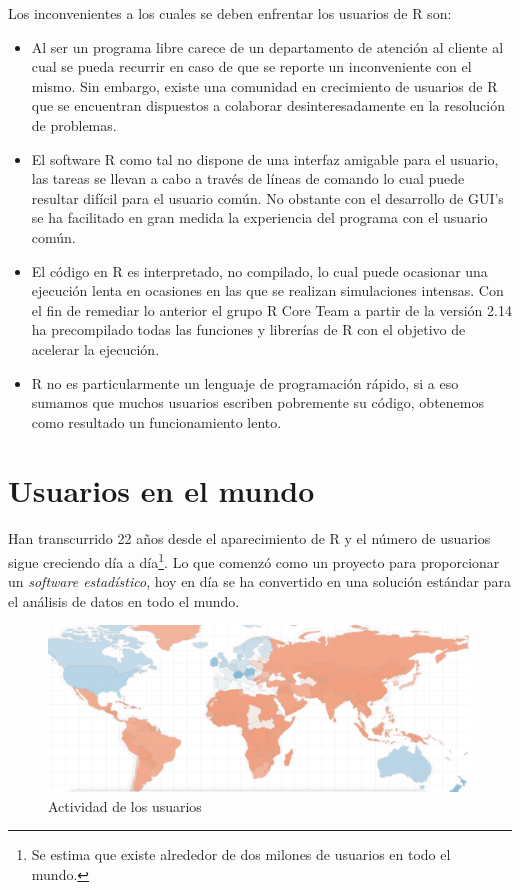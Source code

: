 \documentclass[11pt,a4paper,oneside]{book}\usepackage[]{graphicx}\usepackage[]{color}
\begin{document}
Los inconvenientes a los cuales se deben enfrentar los usuarios de R son:
\begin{itemize}
  \item Al ser un programa libre carece de un departamento de atención al cliente al cual se pueda recurrir en caso de que se reporte un inconveniente con el mismo. Sin embargo, existe una comunidad en crecimiento de usuarios de R que se encuentran dispuestos a colaborar desinteresadamente en la resolución de problemas.
  \item El software R como tal no dispone de una interfaz amigable para el usuario, las tareas se llevan a cabo a través de líneas de comando lo cual puede resultar difícil para el usuario común. No obstante con el desarrollo de GUI's se ha facilitado en gran medida la experiencia del programa con el usuario común.
  \item El código en R es interpretado, no compilado, lo cual puede ocasionar una ejecución lenta en ocasiones en las que se realizan simulaciones intensas. Con el fin de remediar lo anterior el grupo R Core Team a partir de la versión 2.14 ha precompilado todas las funciones y librerías de R con el objetivo de acelerar la ejecución.
  \item R no es particularmente un lenguaje de programación rápido, si a eso sumamos que muchos usuarios escriben pobremente su código, obtenemos como resultado un funcionamiento lento.
\end{itemize}

\section{Usuarios en el mundo}

Han transcurrido 22 años desde el aparecimiento de R y el número de usuarios sigue creciendo día a día\footnote{Se estima que existe alrededor de dos milones de usuarios en todo el mundo.}. Lo que comenzó como un proyecto para proporcionar un \emph{software estadístico}, hoy en día se ha convertido en una solución estándar para el análisis de datos en todo el mundo.

\begin{figure}[H]
\centering
\includegraphics[scale=.5]{figuras/rapporter.pdf}
\caption{Actividad de los usuarios}
\end{figure}
\end{document}
